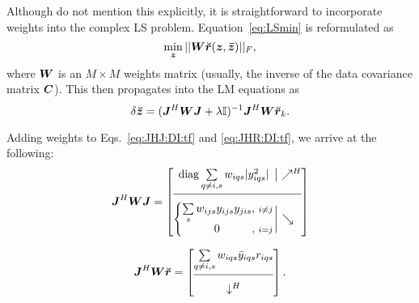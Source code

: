 \documentclass[useAMS,usenatbib]{mn2e}
\makeatletter
\newcommand{\II}{\mathbb{I}}
\newcommand{\mat}[1]{{\bmath{#1}}}
\newcommand{\JJ}{\mat{J}} %
\newcommand{\MM}{\mat{M}}
\newcommand{\GG}{\mat{G}}
\newcommand{\Matrix}[2]{\left [ \begin{array}{@{}#1@{}}#2\end{array} \right ]}
\newcommand{\Stack}[1]{\begin{array}{@{}c@{}}#1\end{array}}
\newcommand{\AUG}[1]{\bmath{\breve{#1}}}
\newcommand{\Zz}{\AUG{z}}
\newcommand{\Rr}{\AUG{r}}
\numberwithin{equation}{section} %
\providecommand{\DIFaddbegin}{} %
\providecommand{\DIFaddend}{} %
\makeatother
\begin{document}
Although \citet{ComplexOpt} do not mention this explicitly, it is straightforward to incorporate weights into the 
complex LS problem. Equation~\ref{eq:LSmin} is reformulated as
\begin{equation}
\label{eq:LSmin:w}
\min_{\bmath{z}} ||\mat{W} \Rr(\bmath{z},\bmath{\bar z})||_F,
\end{equation}
where $\mat{W}$ is an $M\times M$ weights matrix (usually, the inverse of the data covariance matrix $\mat{C}$). This then propagates into the LM equations as
\begin{equation}
\label{eq:LM:W}
\delta\Zz = (\JJ^H \mat{W} \JJ + \lambda\II)^{-1}\JJ^H \mat{W} \Rr_k.
\end{equation}

Adding weights to Eqs.~\ref{eq:JHJ:DI:tf} and \ref{eq:JHR:DI:tf}, we arrive at the following:
\begin{equation}
\label{eq:JHJ:DI:tfw}
\JJ^H\mat{W}\JJ = 
\JHJblocks{
  \mathrm{diag} \sum\limits_{q\ne i,s} w_{iqs} |y^2_{iqs}|
}{
  \left \{ 
  \begin{array}{@{}c@{,~}c@{}}
   \sum\limits_{s} w_{ijs} y_{ijs}y_{jis}&{\scriptstyle i\ne j} \\
   0 &{\scriptstyle i=j}
  \end{array} \right . 
}
\DIFaddend \end{equation}

\begin{equation}
\label{eq:JHR:DI:tfw}
\JJ^H\mat{W}\Rr 
= \Matrix{c}{
\sum\limits_{q\ne i,s} w_{iqs} \bar{y}_{iqs} r_{iqs}   \\
\hline\\[-8pt]
\downarrow^H
}.
\end{equation}


\DIFaddbegin \newcommand{\GGd}{\GG^{(d)}}
\newcommand{\GGdH}{\GG^{(d)H}}
\newcommand{\MMd}{\MM^{(d)}}
\newcommand{\YYd}{\YY^{(d)}}
\newcommand{\YYdH}{\YY^{(d)H}}
\newcommand{\YYc}{\YY^{(c)}}
\newcommand{\YYcH}{\YY^{(c)H}}
\newcommand{\ggd}{g^{(d)}}
\newcommand{\ggdH}{\bar{g}^{(d)}}
\newcommand{\ggc}{g^{(c)}}
\newcommand{\ggcH}{\bar{g}^{(c)}}
\newcommand{\mmc}{m^{(c)}}
\newcommand{\mmd}{m^{(d)}}
\newcommand{\mmcH}{\bar{m}^{(c)}}
\newcommand{\mmdH}{\bar{m}^{(d)}}
\newcommand{\yyd}{y^{(d)}}
\newcommand{\yydH}{\bar{y}^{(d)}}
\newcommand{\yyc}{y^{(c)}}
\newcommand{\yycH}{\bar{y}^{(c)}}
\end{document}
